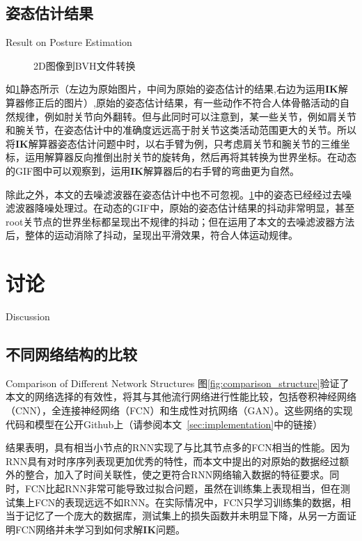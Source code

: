 \subsection{姿态估计结果}{Result on Posture Estimation}
\begin{figure}
\centering
{}
\caption{2D图像到BVH文件转换}
\label{fig:2dtobvh}
\end{figure}
如\cref{fig:2dtobvh}静态所示（左边为原始图片，中间为原始的姿态估计的结果\cite{kanazawa2018end},右边为运用$\mathbf{IK}$解算器修正后的图片）,原始的姿态估计结果，有一些动作不符合人体骨骼活动的自然规律，例如肘关节向外翻转。但与此同时可以注意到，某一些关节，例如肩关节和腕关节，在姿态估计中的准确度远远高于肘关节这类活动范围更大的关节。所以将$\mathbf{IK}$解算器姿态估计问题中时，以右手臂为例，只考虑肩关节和腕关节的三维坐标，运用解算器反向推倒出肘关节的旋转角，然后再将其转换为世界坐标。在动态的GIF图中可以观察到，运用$\mathbf{IK}$解算器后的右手臂的弯曲更为自然。

除此之外，本文的去噪滤波器在姿态估计中也不可忽视。\cref{fig:2dtobvh}中的姿态已经经过去噪滤波器降噪处理过。在动态的GIF中，原始的姿态估计结果的抖动非常明显，甚至root关节点的世界坐标都呈现出不规律的抖动；但在运用了本文的去噪滤波器方法后，整体的运动消除了抖动，呈现出平滑效果，符合人体运动规律。


\section{讨论}{Discussion}

\subsection{不同网络结构的比较}{Comparison of Different Network Structures}
图\ref{fig:comparison_structure}验证了本文的网络选择的有效性，将其与其他流行网络进行性能比较，包括卷积神经网络（CNN），全连接神经网络（FCN）和生成性对抗网络（GAN）。这些网络的实现代码和模型在公开Github上（请参阅本文~\ref{sec:implementation}中的链接）

结果表明，具有相当小节点的RNN实现了与比其节点多的FCN相当的性能。因为RNN具有对时序序列表现更加优秀的特性，而本文中提出的对原始的数据经过额外的整合，加入了时间关联性，使之更符合RNN网络输入数据的特征要求。同时，FCN比起RNN非常可能导致过拟合问题，虽然在训练集上表现相当，但在测试集上FCN的表现远远不如RNN。在实际情况中，FCN只学习训练集的数据，相当于记忆了一个庞大的数据库，测试集上的损失函数并未明显下降，从另一方面证明FCN网络并未学习到如何求解$\mathbf{IK}$问题。

